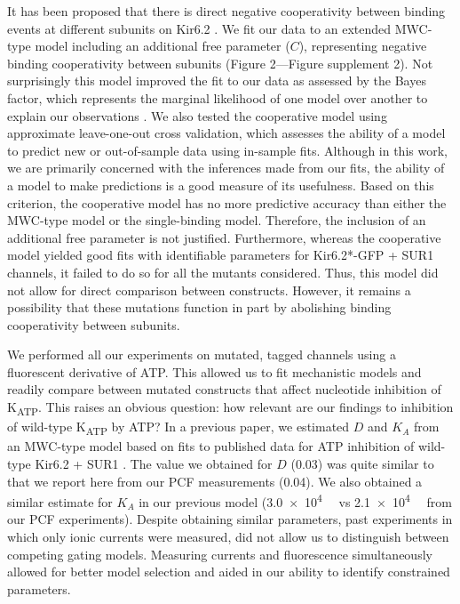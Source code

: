 \documentclass[10pt,lineno, doublespacing]{elife_modified}
\begin{document}
It has been proposed that there is direct negative cooperativity between binding events at different subunits on Kir6.2 \citep{RN115}.
We fit our data to an extended MWC-type model including an additional free parameter ($C$), representing negative binding cooperativity between subunits (Figure 2—Figure supplement 2).
Not surprisingly this model improved the fit to our data as assessed by the Bayes factor, which represents the marginal likelihood of one model over another to explain our observations \citep{RN103, RN104}.
We also tested the cooperative model using approximate leave-one-out cross validation, which assesses the ability of a model to predict new or out-of-sample data using in-sample fits.
Although in this work, we are primarily concerned with the inferences made from our fits, the ability of a model to make predictions is a good measure of its usefulness.
Based on this criterion, the cooperative model has no more predictive accuracy than either the MWC-type model or the single-binding model.
Therefore, the inclusion of an additional free parameter is not justified.
Furthermore, whereas the cooperative model yielded good fits with identifiable parameters for Kir6.2*-GFP + SUR1 channels, it failed to do so for all the mutants considered.
Thus, this model did not allow for direct comparison between constructs.
However, it remains a possibility that these mutations function in part by abolishing binding cooperativity between subunits.

We performed all our experiments on mutated, tagged channels using a fluorescent derivative of ATP.
This allowed us to fit mechanistic models and readily compare between mutated constructs that affect nucleotide inhibition of K\textsubscript{ATP}.
This raises an obvious question: how relevant are our findings to inhibition of wild-type K\textsubscript{ATP} by ATP?
In a previous paper, we estimated $D$ and $K_A$ from an MWC-type model based on fits to published data for ATP inhibition of wild-type Kir6.2 + SUR1 \citep{RN28, RN3}.
The value we obtained for $D$ (0.03) was quite similar to that we report here from our PCF measurements (0.04).
We also obtained a similar estimate for $K_A$ in our previous model (\SI{3.0e4}{\per\Molar} vs \SI{2.1e4}{\per\Molar} from our PCF experiments).
Despite obtaining similar parameters, past experiments in which only ionic currents were measured, did not allow us to distinguish between competing gating models.
Measuring currents and fluorescence simultaneously allowed for better model selection and aided in our ability to identify constrained parameters.
\end{document}
